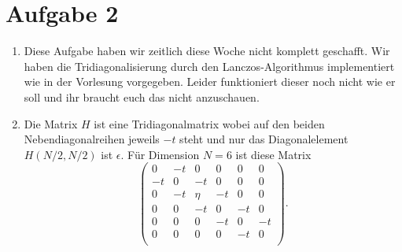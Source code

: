 \section*{Aufgabe 2}

\begin{enumerate}[label=\alph*)]

    \item Diese Aufgabe haben wir zeitlich diese Woche nicht komplett geschafft. Wir haben die Tridiagonalisierung durch den Lanczos-Algorithmus implementiert wie in der Vorlesung vorgegeben. Leider funktioniert dieser noch nicht wie er soll und ihr braucht euch das nicht anzuschauen.

    \item    
    Die Matrix $H$ ist eine Tridiagonalmatrix wobei auf den beiden Nebendiagonalreihen jeweils $-t$ steht und nur das Diagonalelement $H(N/2, N/2)$ ist $\epsilon$. Für Dimension $N=6$ ist diese Matrix
    \begin{equation*}
        \begin{pmatrix}
            0& -t& 0& 0& 0& 0 \\
            -t&  0& -t& 0& 0& 0 \\
            0&  -t& \eta& -t& 0& 0 \\
            0&  0& -t& 0& -t& 0 \\
            0&  0& 0& -t& 0& -t \\
            0&  0& 0& 0& -t& 0 \\
        \end{pmatrix}.
    \end{equation*}
    

\end{enumerate}
